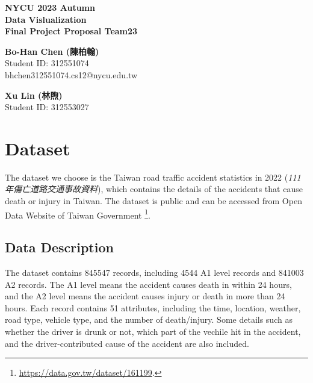 \documentclass[a4paper, oneside, final, 12pt]{scrartcl} %
\begin{document}


\begin{center}
    {\fontsize{18}{30}\textbf{NYCU 2023 Autumn \\ Data Vislualization \\ Final Project Proposal Team23}} \\
\end{center}

  \begin{minipage}[t]{0.45\textwidth}
    \begin{center}
      \textbf{Bo-Han Chen (陳柏翰)} \\
      Student ID: 312551074 \\
      bhchen312551074.cs12@nycu.edu.tw
    \end{center}
  \end{minipage}
  \begin{minipage}[t]{0.45\textwidth}
    \begin{center}
      \textbf{Xu Lin (林煦)} \\
      Student ID: 312553027 \\
    \end{center}
  \end{minipage}

\section{Dataset}

\begingroup
\raggedright

The dataset we choose is the Taiwan road traffic accident statistics 
in 2022 (\emph{111年傷亡道路交通事故資料}), which contains the details of
the accidents that cause death or injury in Taiwan.
The dataset is public and can be accessed from Open Data Website of Taiwan Government
\footnote{\url{https://data.gov.tw/dataset/161199}.}.

\subsection{Data Description}

The dataset contains 845547 records, 
including 4544 A1 level records and 841003 A2 records.
The A1 level means the accident causes death in within 24 hours,
and the A2 level means the accident causes injury or death in more than 24 hours.
Each record contains 51 attributes, including the time, location,
weather, road type, vehicle type, and the number of death/injury.
Some details such as whether the driver is drunk or not, 
which part of the vechile hit in the accident, 
and the driver-contributed cause of the accident are also included.
\end{document}
